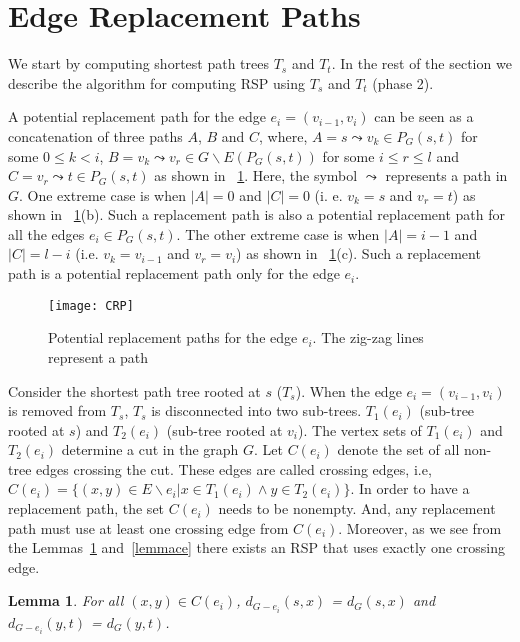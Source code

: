 \documentclass[11pt,a4paper]{llncs}
\newtheorem{lem}[thm]{Lemma}
\begin{document}
\section{Edge Replacement Paths}
\label{ersp}
We start by computing shortest path trees $T_{s}$ and $T_{t}$. In the rest of the section
we describe the algorithm for computing RSP using $T_{s}$ and $T_{t}$ (phase 2).

A potential replacement path for the edge $e_{i} = (v_{i-1}, v_{i})$ can be
seen as a concatenation of three paths $A$, $B$ and $C$, where, $A = s \leadsto v_{k} \in P_{G}(s, t)$ for
some $0 \leq k < i$, $B = v_{k} \leadsto v_{r} \in G \backslash E(P_{G}(s, t))$  for some $i \leq r \leq l$ and
$C = v_{r} \leadsto t \in P_{G}(s, t)$ as shown in \figurename~\ref{fig1}. Here, the symbol $\leadsto$ represents a path in $G$.
One extreme case is when $|A| = 0$ and $|C| = 0$ (i. e. $v_{k} = s$ and $v_{r} = t$) as shown in \figurename~\ref{fig1}(b).
Such a replacement path is also a potential replacement path for all the edges $e_{i} \in P_{G}(s, t)$. The other extreme case is when $|A| = i - 1$
and $|C| = l - i$ (i.e. $v_{k} = v_{i-1}$ and $v_{r} = v_{i}$) as shown in \figurename~\ref{fig1}(c).
Such a replacement path is a potential replacement path only for the edge $e_{i}$.

\begin{figure}[!ht]
\centering
\texttt{[image: CRP]}
\caption{Potential replacement paths for the edge $e_{i}$.
The zig-zag lines represent a path} \label{fig1}
\end{figure}

Consider the shortest path tree rooted at $s$ ($T_{s}$). When the edge $e_{i} = (v_{i-1},v_{i})$
is removed from $T_{s}$, $T_{s}$ is disconnected into two sub-trees. $T_{1}(e_{i})$ (sub-tree rooted at $s$)
and $T_{2}(e_{i})$ (sub-tree rooted at $v_{i}$). The vertex sets of $T_{1}(e_{i})$ and $T_{2}(e_{i})$
determine a cut in the graph $G$. Let $C(e_{i})$ denote the set of all non-tree edges crossing the cut.
These edges are called crossing edges, i.e,
$C(e_{i}) = \{ (x, y) \in E \backslash {e_{i}} | x \in T_{1}(e_{i}) \wedge y \in T_{2}(e_{i}) \}$.
In order to have a replacement path, the set $C(e_{i})$ needs to be nonempty. And,
any replacement path must use at least one crossing edge from $C(e_{i})$.
Moreover, as we see from the Lemmas~\ref{lemmadist} and~\ref{lemmace} there exists
an RSP that uses exactly one crossing edge.



\begin{lem}
\label{lemmadist}
For all $(x, y) \in C(e_{i})$, $d_{G-{e_{i}}}(s,x)$ = $d_{G}(s,x)$ and $d_{G-{e_{i}}}(y,t)$ = $d_{G}(y,t)$.
\end{lem}
\end{document}
